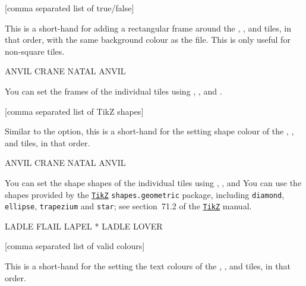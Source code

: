 \documentclass[svgnames]{report}
\newcommand\ctan[1]{\href{https://www.ctan.org/pkg/#1}{\texttt{#1}}}
\begin{document}
  [comma separated list of true/false]

  This is a short-hand for adding a rectangular frame around the
  , ,  and 
  tiles, in that order, with the same background colour as the
   file. This is only useful for non-square tiles.

  \begin{example}
  \begin{wordle}[frames={false,true,true}, shapes=circle]{ANVIL}
    CRANE
    NATAL
    ANVIL
  \end{wordle}
  \end{example}

  You can set the frames of the individual tiles using
  , ,
   and .

  [comma separated list of TikZ shapes]

  Similar to the  option, this is a short-hand for the
  setting shape colour of the , ,
   and  tiles, in that order.

  \begin{example}
  \begin{wordle}[shapes={circle, rectangle, circle}]{ANVIL}
    CRANE
    NATAL
    ANVIL
  \end{wordle}
  \end{example}

  You can set the shape shapes of the individual tiles using
  , ,
   and 
  You can use the shapes provided by the \ctan{TikZ}
  \texttt{shapes.geometric} package, including \texttt{diamond},
  \texttt{ellipse}, \texttt{trapezium} and \texttt{star}; see
  section~71.2 of the \ctan{TikZ} manual.

  \begin{example}
  \begin{wordle}[shapes={diamond, ellipse, star}]{LADLE}
     FLAIL
     LAPEL
     *
     LADLE
     LOVER
  \end{wordle}
  \end{example}

  [comma separated list of valid colours]

  This is a short-hand for the setting the text colours of the
  , ,  and 
  tiles, in that order.
\end{document}
